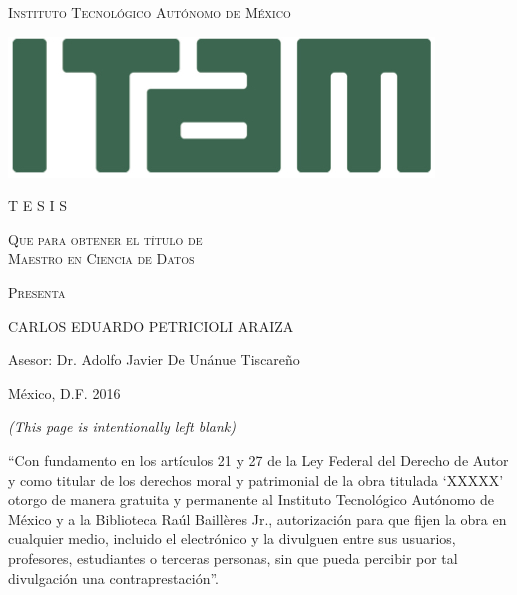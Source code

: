 \thispagestyle{empty}
\begin{center}
\LARGE \scshape Instituto Tecnológico Autónomo de México \\
\end{center}

\vspace{4mm}



\begin{center}
\includegraphics[scale=.7]{../img/ITAM.jpg}


\vspace{15mm}


\scshape \Large \thetitle

\vfill
\scshape \large T E S I S 


\vspace{3mm}
\scshape Que para obtener el título de \\

\vspace{3mm}
\scshape Maestro en Ciencia de Datos

\vspace{3mm}
\scshape Presenta

\vspace{4mm}
\Large CARLOS EDUARDO PETRICIOLI ARAIZA


\vspace{5mm}

\large Asesor: Dr.  Adolfo Javier De Unánue Tiscareño
\end{center}
\vspace{10mm}
México, D.F.   \hfill       2016


\newpage

\thispagestyle{empty}

\begin{flushright}
\textit{(This page is intentionally left blank)}
\end{flushright}

\newpage
\thispagestyle{plain}
\setcounter{page}{1}

\noindent ``Con fundamento en los artículos 21 y 27 de la Ley Federal del Derecho de Autor y como titular de los derechos moral y patrimonial de la obra titulada `{\scshape XXXXX}' otorgo de manera gratuita y permanente al Instituto Tecnológico Autónomo de México y a la Biblioteca Raúl Baillères Jr., autorización para que fijen la obra en cualquier medio, incluido el electrónico y la divulguen entre sus usuarios, profesores, estudiantes o terceras personas, sin que pueda percibir por tal divulgación una contraprestación''.

